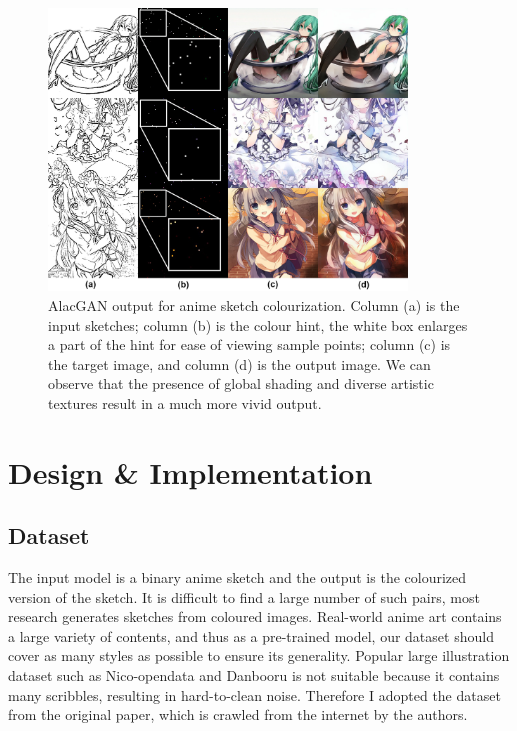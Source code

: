 \begin{figure}
    \centering
    \includegraphics[width=0.85\textwidth]{images/colorization/alacgan.jpg}
    \caption[AlacGAN output for anime sketch colourization.]{AlacGAN output for anime sketch colourization. Column (a) is the input sketches; column (b) is the colour hint, the white box enlarges a part of the hint for ease of viewing sample points; column (c) is the target image, and column (d) is the output image. We can observe that the presence of global shading and diverse artistic textures result in a much more vivid output.}
    \label{fig:colorization_alacgan}
\end{figure}

\section{Design \& Implementation}

\subsection{Dataset}
The input model is a binary anime sketch and the output is the colourized version of the sketch. It is difficult to find a large number of such pairs, most research generates sketches from coloured images. Real-world anime art contains a large variety of contents, and thus as a pre-trained model, our dataset should cover as many styles as possible to ensure its generality. Popular large illustration dataset such as Nico-opendata\cite{Undefineda} and Danbooru\cite{branwenDanbooru2021LargeScaleCrowdsourced2015} is not suitable because it contains many scribbles, resulting in hard-to-clean noise. Therefore I adopted the dataset from the original paper, which is crawled from the internet by the authors.

